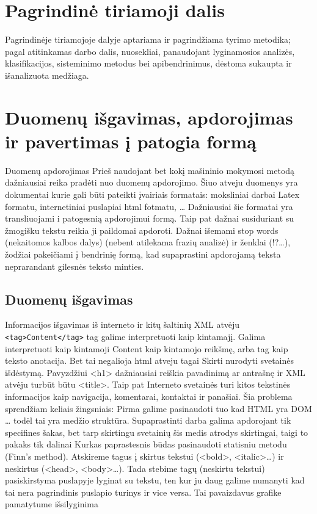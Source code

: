 \documentclass{VUMIFInfKursinis}
\begin{document}
\section{Pagrindinė tiriamoji dalis}
Pagrindinėje tiriamojoje dalyje aptariama ir pagrindžiama tyrimo metodika;
pagal atitinkamas darbo dalis, nuosekliai, panaudojant lyginamosios analizės,
klasifikacijos, sisteminimo metodus bei apibendrinimus, dėstoma sukaupta ir
išanalizuota medžiaga.

\section{Duomenų išgavimas, apdorojimas ir pavertimas į patogia formą}
Duomenų apdorojimas
	Prieš naudojant bet kokį mašininio mokymosi metodą dažniausiai reika pradėti nuo duomenų apdorojimo. Šiuo atveju duomenys yra dokumentai kurie gali būti pateikti įvairiais formatais: moksliniai darbai Latex formatu, internetiniai puslapiai html fotmatu, … Dažniausiai šie formatai yra transliuojami i patogesnią apdorojimui formą. Taip pat dažnai susiduriant su žmogišku tekstu reikia ji paildomai apdoroti. Dažnai išemami stop words (nekaitomos kalbos dalys) (nebent atilekama frazių analizė) ir ženklai (!?\ldots), žodžiai pakeičiami į bendrinię formą, kad supaprastini apdorojamą teksta neprarandant gilesnės teksto minties. 
\subsection{Duomenų išgavimas}
Informacijos išgavimas iš interneto ir kitų šaltinių
	XML atvėju \texttt{<tag>Content</tag>} tag galime interpretuoti kaip kintamajį. Galima interpretuoti kaip  kintamoji Content kaip kintamojo reikšmę, arba tag kaip teksto anotacija. Bet tai negalioja html atveju tagai Skirti nurodyti svetainės išdėstymą. Pavyzdžiui <h1> dažniausiai reiškia pavadinimą ar antrašnę ir XML atvėju turbūt būtu <title>. Taip pat Interneto svetainės turi  kitos tekstinės informacijos kaip navigacija, komentarai, kontaktai ir panašiai. Šia problema sprendžiam keliais žingsniais:
Pirma galime pasinaudoti tuo kad HTML yra DOM … todėl tai yra medžio struktūra. Supaprastinti darba galima apdorojant tik specifines šakas, bet tarp skirtingu svetainių šis medis atrodys skirtingai, taigi to pakaks tik dalinai
Kurkas paprastesnis būdas pasinaudoti statisniu metodu (Finn’s method). Atskireme tagus į skirtus tekstui (<bold>, <italic>\ldots) ir neskirtus (<head>, <body>\ldots). Tada stebime tagų (neskirtu tekstui) pasiskirstyma puslapyje lyginat su tekstu, ten kur ju daug galime numanyti kad tai nera pagrindinis puslapio turinys ir vice versa. Tai pavaizdavus grafike pamatytume išsilyginima
\end{document}
